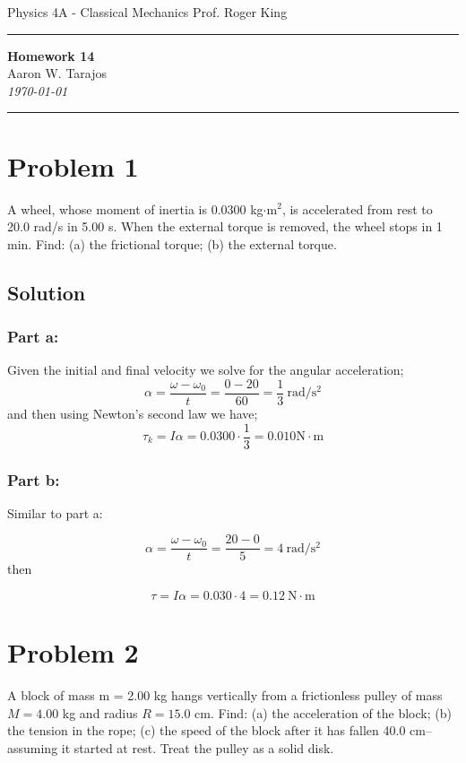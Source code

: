 \documentclass{article}
\begin{document}
\noindent
Physics 4A - Classical Mechanics \hfill Prof. Roger King

\noindent\rule{\textwidth}{0.4pt}

\begin{center}
    \textbf{\LARGE Homework 14} \\
    \vspace{12pt}
    \large Aaron W. Tarajos \\
    \textit{\today}
\end{center}

\noindent\rule{\textwidth}{0.4pt}

\section*{Problem 1}
A wheel, whose moment of inertia is 0.0300 kg$\cdot$m$^2$, is accelerated from rest to 20.0 rad/s in 5.00 s. When the
external torque is removed, the wheel stops in 1 min. Find: (a) the frictional torque; (b) the external torque.

\subsection*{Solution}
\subsubsection*{Part a:}
Given the initial and final velocity we solve for the angular acceleration;
\[
	\alpha = \frac{\omega - \omega_0}{t} = \frac{0-20}{60} = \frac{1}{3}\ \text{rad}/\text{s}^2
\]
and then using Newton's second law we have;
\[
	\tau_k = I \alpha = 0.0300 \cdot \frac{1}{3} = \boxed{0.010} \text{N} \cdot \text{m}
\]
\subsubsection*{Part b:}
Similar to part a:

\[
	\alpha = \frac{\omega - \omega_0}{t} = \frac{20 - 0}{5} = 4\ \text{rad}/\text{s}^2
\]
then

\[
	\tau = I \alpha = 0.030 \cdot 4 = \boxed{0.12\ \text{N} \cdot \text{m}}
\]

\section*{Problem 2}
A block of mass m = 2.00 kg hangs vertically from a frictionless pulley of mass $M = 4.00$ kg and radius $R =
15.0$ cm. Find: (a) the acceleration of the block; (b) the tension in the rope; (c) the speed of the block after it has
fallen 40.0 cm-- assuming it started at rest. Treat the pulley as a solid disk.
\end{document}
